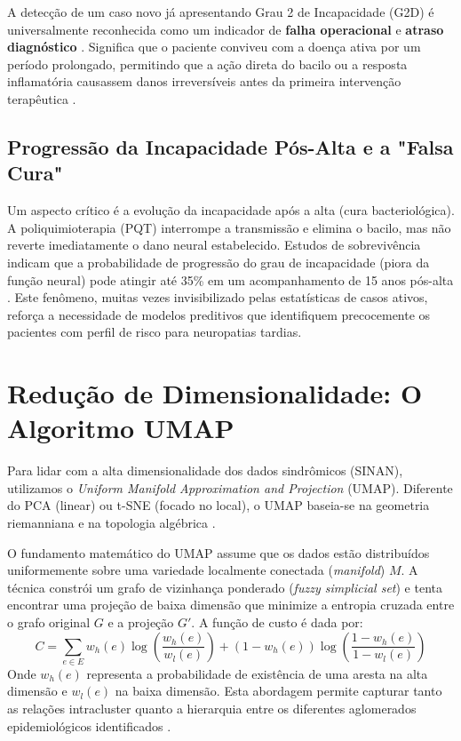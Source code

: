 A detecção de um caso novo já apresentando Grau 2 de Incapacidade (G2D) é universalmente reconhecida como um indicador de \textbf{falha operacional} e \textbf{atraso diagnóstico} \cite{delayed_diagnosis_northeast}. Significa que o paciente conviveu com a doença ativa por um período prolongado, permitindo que a ação direta do bacilo ou a resposta inflamatória causassem danos irreversíveis antes da primeira intervenção terapêutica \cite{freitas2025evaluating}.

\subsection{Progressão da Incapacidade Pós-Alta e a "Falsa Cura"}

Um aspecto crítico é a evolução da incapacidade após a alta (cura bacteriológica). A poliquimioterapia (PQT) interrompe a transmissão e elimina o bacilo, mas não reverte imediatamente o dano neural estabelecido. Estudos de sobrevivência indicam que a probabilidade de progressão do grau de incapacidade (piora da função neural) pode atingir até 35\% em um acompanhamento de 15 anos pós-alta \cite{disability_progression_survival}. Este fenômeno, muitas vezes invisibilizado pelas estatísticas de casos ativos, reforça a necessidade de modelos preditivos que identifiquem precocemente os pacientes com perfil de risco para neuropatias tardias.

\section{Redução de Dimensionalidade: O Algoritmo UMAP}

Para lidar com a alta dimensionalidade dos dados sindrômicos (SINAN), utilizamos o \textit{Uniform Manifold Approximation and Projection} (UMAP). Diferente do PCA (linear) ou t-SNE (focado no local), o UMAP baseia-se na geometria riemanniana e na topologia algébrica \cite{mcinnes2018umap}.

O fundamento matemático do UMAP assume que os dados estão distribuídos uniformemente sobre uma variedade localmente conectada (\textit{manifold}) $M$. A técnica constrói um grafo de vizinhança ponderado (\textit{fuzzy simplicial set}) e tenta encontrar uma projeção de baixa dimensão que minimize a entropia cruzada entre o grafo original $G$ e a projeção $G'$. A função de custo é dada por:
\begin{equation}
    C = \sum_{e \in E} w_h(e) \log\left(\frac{w_h(e)}{w_l(e)}\right) + (1 - w_h(e)) \log\left(\frac{1 - w_h(e)}{1 - w_l(e)}\right)
\end{equation}
Onde $w_h(e)$ representa a probabilidade de existência de uma aresta na alta dimensão e $w_l(e)$ na baixa dimensão. Esta abordagem permite capturar tanto as relações intracluster quanto a hierarquia entre os diferentes aglomerados epidemiológicos identificados \cite{becht2018dimensionality}.

